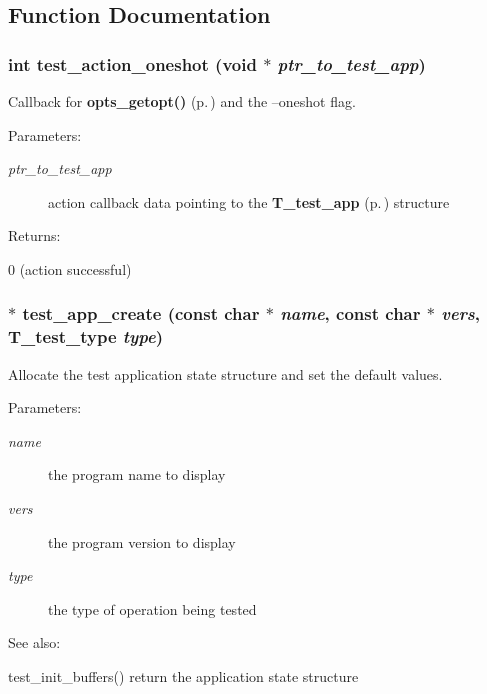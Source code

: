 \subsection{Function Documentation}
\subsubsection{\setlength{\rightskip}{0pt plus 5cm}int test\_\-action\_\-oneshot (void $\ast$ {\em ptr\_\-to\_\-test\_\-app})}\label{test__utils_8h_a34}


Callback for {\bf opts\_\-getopt()} {\rm (p.\,\pageref{group__opts_a3})} and the --oneshot flag.

\begin{Desc}
\item[Parameters: ]\par
\begin{description}
\item[{\em 
ptr\_\-to\_\-test\_\-app}]action callback data pointing to the {\bf T\_\-test\_\-app} {\rm (p.\,\pageref{structT__test__app})} structure \end{description}
\end{Desc}
\begin{Desc}
\item[Returns: ]\par
0 (action successful) \end{Desc}
\subsubsection{$\ast$ test\_\-app\_\-create (const char $\ast$ {\em name}, const char $\ast$ {\em vers}, {\bf T\_\-test\_\-type} {\em type})}\label{test__utils_8h_a35}


Allocate the test application state structure and set the default values.

\begin{Desc}
\item[Parameters: ]\par
\begin{description}
\item[{\em 
name}]the program name to display \item[{\em 
vers}]the program version to display \item[{\em 
type}]the type of operation being tested \end{description}
\end{Desc}
\begin{Desc}
\item[See also: ]\par
test\_\-init\_\-buffers() return the application state structure \end{Desc}
